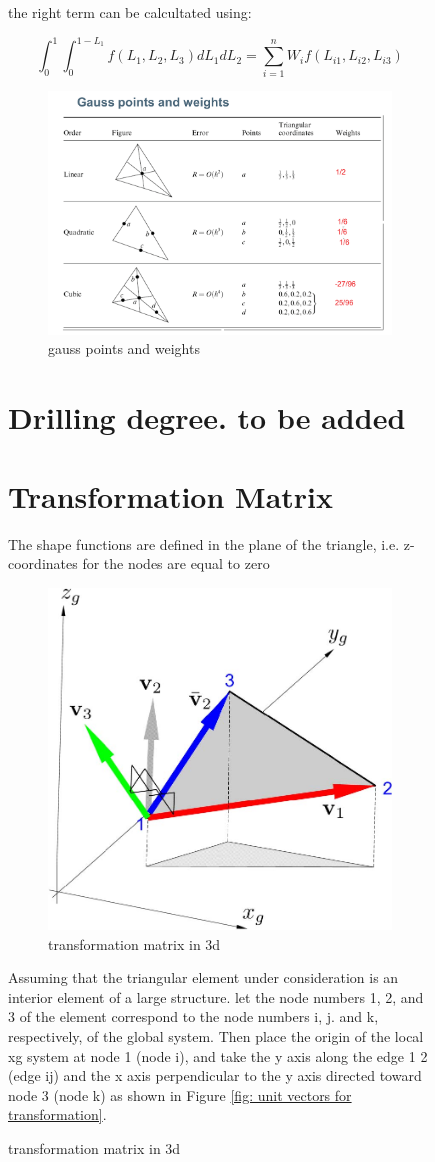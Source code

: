 \begin{figure}[h!]
the right term can be calcultated using:

\begin{equation}\label{key}
\int_{0}^{1} \int_{0}^{1-L_1} f(L_1, L_2, L_3) dL_1 dL_2 = \sum_{i=1}^{n} W_i f(L_{i1}, L_{i2}, L_{i3})
\end{equation}

\begin{figure}[h!]
\centering
\includegraphics[width=0.4\linewidth]{figure/gauss_points_and_weights}
\caption{gauss points and weights}
\label{fig: gauss points and weights}
\end{figure}

\section{Drilling degree. to be added}

\section{Transformation Matrix}
The shape functions are defined in the plane of the triangle, i.e. z-coordinates for the nodes are equal to zero

\begin{figure}[h!]
	\centering
	\includegraphics[width=0.5\linewidth]{figure/transformation_matrix}
	\caption{transformation matrix in 3d}
	\label{fig:transformationmatrix}
\end{figure}

Assuming that the triangular element under consideration is an interior element of a large structure. let the node numbers 1, 2, and 3 of the element correspond to the node numbers i, j. and
k, respectively, of the global system. Then place the origin of the local xg system at node 1 (node i), and take the y axis along the edge 1 2 (edge ij) and the x axis perpendicular
to the y axis directed toward node 3 (node k) as shown in Figure \ref{fig: unit vectors for transformation}.


\end{figure}
